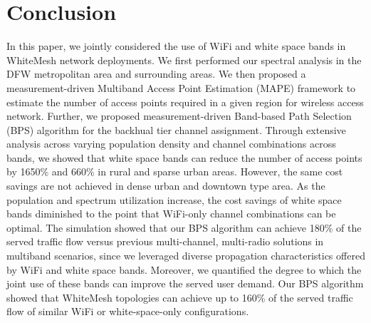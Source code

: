 \section{Conclusion}
\label{sec:conclusion}
In this paper, we jointly considered the use of WiFi and white space bands 
in WhiteMesh network deployments. 
We first performed our spectral analysis in the DFW metropolitan area and surrounding 
areas. We then proposed a measurement-driven Multiband Access Point Estimation 
(MAPE) framework to estimate the number of access points required in a given region for 
wireless access network. Further, we proposed measurement-driven Band-based Path Selection (BPS) algorithm 
for the backhual tier channel assignment. 
%
Through extensive analysis across varying population density and channel combinations across bands, 
we showed that white space bands can reduce the number of access points by 1650\%
and 660\% in rural and sparse urban areas. However, the same cost savings are not achieved in dense urban 
and downtown type area. As the population and spectrum utilization increase, the cost savings of 
white space bands diminished to the point that WiFi-only channel combinations can be optimal.
The simulation showed that our BPS algorithm can achieve 180\% of the served traffic flow versus previous 
multi-channel, multi-radio solutions in multiband scenarios, since we leveraged diverse propagation 
characteristics offered by WiFi and white space bands. Moreover, we quantified the degree to which the joint 
use of these bands can improve the served user demand. Our BPS algorithm showed that WhiteMesh topologies 
can achieve up to 160\% of the served traffic flow of similar WiFi or white-space-only configurations.



